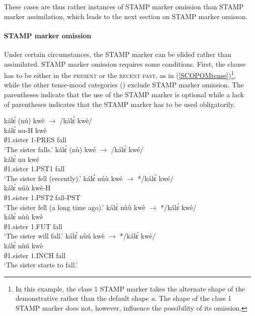 \noindent These cases are thus rather instances of STAMP marker omission than STAMP marker assimilation, which leads to the next section on STAMP marker omisson.



\paragraph{STAMP marker omission}
Under certain circumstances, the STAMP marker can be elided rather than assimilated. STAMP marker omission requires some conditions. First, the clause has to be either in the \textsc{present} or the \textsc{recent past}, as in (\ref{SCOPOMtense})\footnote{In this example, the class 1 STAMP marker takes the alternate shape of the demonstrative rather than the default shape {\itshape a}. The shape of the class 1 STAMP marker does not, however, influence the possibility of its omission.}, while the other tense-mood categories () exclude STAMP marker omission.  The parentheses indicate that the use of the STAMP marker is optional while a lack of parentheses indicates that the STAMP marker has to be used obligatorily. 

\begin{exe}
\ex\label{SCOPOMtense}
\begin{xlist}
\ex \label{SCOPOMtense1}
  \glll  kálɛ́ (nú) kwè $\rightarrow$ /kálɛ́ kwè/ \\
         kálɛ́ nu-H kwè \\
              $\emptyset$1.sister 1-PRES fall \\
    \trans `The sister falls.'
\ex\label{SCOPOMtense2}
  \glll  kálɛ́ (nù) kwé $\rightarrow$ /kálɛ́ kwé/ \\
          kálɛ́ nu kwé  \\
              $\emptyset$1.sister 1.PST1 fall \\
    \trans `The sister fell (recently).'
\ex \label{SCOPOMtense3}
  \glll  kálɛ́ núù kwé $\rightarrow$ */kálɛ́ kwé/ \\
       kálɛ́ núù kwè-H  \\
              $\emptyset$1.sister 1.PST2 fall-PST \\
    \trans `The sister fell (a long time ago).'
\ex\label{SCOPOMtense4}
  \glll  kálɛ́ nùù kwè $\rightarrow$ */kálɛ́ kwè/ \\
          kálɛ́ nùù kwè \\
              $\emptyset$1.sister 1.FUT fall \\
    \trans `The sister will fall.'
\ex\label{SCOPOMtense5}
  \glll  kálɛ́ nùú kwè $\rightarrow$ */kálɛ́ kwè/ \\
        kálɛ́ nùú kwè \\
              $\emptyset$1.sister 1.INCH fall \\
    \trans `The sister starts to fall.'
\end{xlist}
\end{exe}

